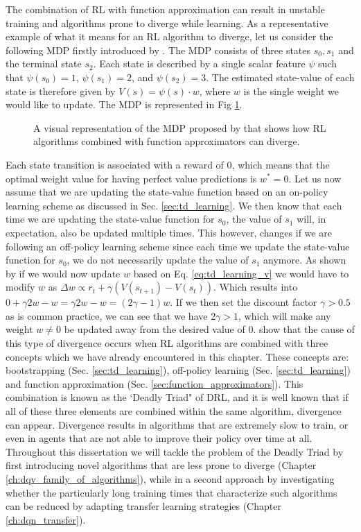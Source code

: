 The combination of RL with function approximation can result in unstable training and algorithms prone to diverge while learning. As a representative example of what it means for an RL algorithm to diverge, let us consider the following MDP firstly introduced by \citet{tsitsiklis1997analysis}. The MDP consists of three states $s_0, s_1$ and the terminal state $s_2$. Each state is described by a single scalar feature $\psi$ such that $\psi(s_0)=1$, $\psi(s_1)=2$, and $\psi(s_2)=3$. The estimated state-value of each state is therefore given by $V(s)=\psi(s) \cdot w$, where $w$ is the single weight we would like to update. The MDP is represented in Fig \ref{fig:deadly_triad}.  
\begin{figure}[ht!]
	\centering
	
\caption{A visual representation of the MDP proposed by \citet{tsitsiklis1997analysis} that shows how RL algorithms combined with function approximators can diverge.}
\label{fig:deadly_triad}
\end{figure}
Each state transition is associated with a reward of $0$, which means that the optimal weight value for having perfect value predictions is $w^{*}=0$. Let us now assume that we are updating the state-value function based on an on-policy learning scheme as discussed in Sec. \ref{sec:td_learning}. We then know that each time we are updating the state-value function for $s_0$, the value of $s_1$ will, in expectation, also be updated multiple times. This however, changes if we are following an off-policy learning scheme since each time we update the state-value function for $s_0$, we do not necessarily update the value of $s_1$ anymore. As shown by \citet{van2018deep_triad} if we would now update $w$ based on Eq. \ref{eq:td_learning_v} we would have to modify $w$ as $\Delta w \propto r_t +\gamma(V(s_{t+1})-V(s_t))$. Which results into $0+\gamma 2w-w=\gamma 2w-w=(2\gamma-1)w$. If we then set the discount factor $\gamma>0.5$ as is common practice, we can see that we have $2\gamma>1$, which will make any weight $w\neq0$  be updated away from the desired value of $0$. \citet{sutton2018reinforcement} show that the cause of this type of divergence occurs when RL algorithms are combined with three concepts which we have already encountered in this chapter. These concepts are: bootstrapping (Sec. \ref{sec:td_learning}), off-policy learning (Sec. \ref{sec:td_learning}) and function approximation (Sec. \ref{sec:function_approximators}).
This combination is known as the `Deadly Triad" of DRL, and it is well known that if all of these three elements are combined within the same algorithm, divergence can appear. Divergence results in algorithms that are extremely slow to train, or even in agents that are not able to improve their policy over time at all. Throughout this dissertation we will tackle the problem of the Deadly Triad by first introducing novel algorithms that are less prone to diverge (Chapter \ref{ch:dqv_family_of_algorithms}), while in a second approach by investigating whether the particularly long training times that characterize such algorithms can be reduced by adapting transfer learning strategies (Chapter \ref{ch:dqn_transfer}).   





